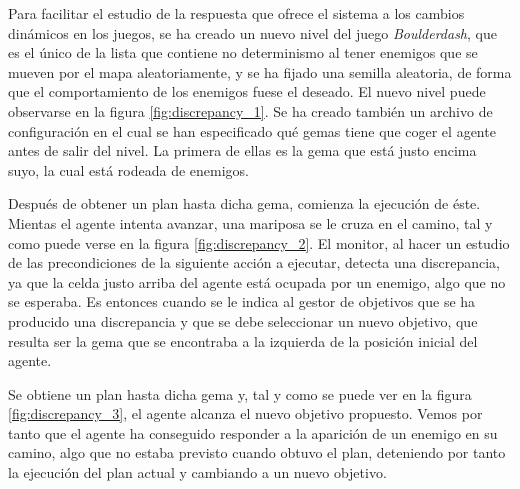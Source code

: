 Para facilitar el estudio de la respuesta que ofrece el sistema a los cambios dinámicos en
los juegos, se ha creado un nuevo nivel del juego \textit{Boulderdash}, que es el
único de la lista que contiene no determinismo al tener enemigos que se mueven por el mapa
aleatoriamente, y se ha fijado una semilla aleatoria, de forma que el comportamiento de los enemigos
fuese el deseado. El nuevo nivel puede observarse en la figura \ref{fig:discrepancy_1}. Se ha creado
también un archivo de configuración en el cual se han especificado qué gemas tiene que coger
el agente antes de salir del nivel. La primera de ellas es la gema que está justo encima suyo,
la cual está rodeada de enemigos.

Después de obtener un plan hasta dicha gema, comienza la ejecución de éste. Mientas el agente
intenta avanzar, una mariposa se le cruza en el camino, tal y como puede verse en la figura
\ref{fig:discrepancy_2}. El monitor, al hacer un estudio de las precondiciones de la siguiente
acción a ejecutar, detecta una discrepancia, ya que la celda justo arriba del agente está
ocupada por un enemigo, algo que no se esperaba. Es entonces cuando se le indica al gestor
de objetivos que se ha producido una discrepancia y que se debe seleccionar un nuevo objetivo,
que resulta ser la gema que se encontraba a la izquierda de la posición inicial del agente.

Se obtiene un plan hasta dicha gema y, tal y como se puede ver en la figura \ref{fig:discrepancy_3},
el agente alcanza el nuevo objetivo propuesto. Vemos por tanto que el agente ha conseguido
responder a la aparición de un enemigo en su camino, algo que no estaba previsto cuando obtuvo
el plan, deteniendo por tanto la ejecución del plan actual y cambiando a un nuevo objetivo.

